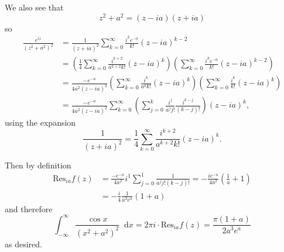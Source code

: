 \documentclass{article}
\newcommand\Res{\mathrm{Res}}
\newcommand\dif{\mathop{}\!\mathrm{d}}
\begin{document}
We also see that
$$
   z^2 + a^2
 = (z - ia)(z + ia)
$$
so
\begin{align*}
   \frac{e^{iz}}{(z^2 + a^2)^2}
&= \frac{1}{(z + ia)^2}
   \sum_{k=0}^\infty
     \frac{i^k e^{-a}}{k!}
     (z - ia)^{k-2} \\
&= \left(
     \frac{1}{4}
     \sum_{k=0}^\infty
       \frac{i^{k+2}}{a^{k+2} k!}
       (z - ia)^k
   \right)
   \left(
     \sum_{k=0}^\infty
       \frac{i^k e^{-a}}{k!}
       (z - ia)^{k-2}
   \right) \\
&= \frac{-e^{-a}}{4a^2 (z - ia)^2}
   \left(
     \sum_{k=0}^\infty
       \frac{i^k}{a^k k!}
       (z - ia)^k
   \right)
   \left(
     \sum_{k=0}^\infty
       \frac{i^k}{k!}
       (z - ia)^{k}
   \right) \\
&= \frac{-e^{-a}}{4a^2 (z - ia)^2}
   \sum_{k=0}^\infty
     \left(
       \sum_{j=0}^k
         \frac{i^j}
              {a^j j!}
         \frac{i^{k-j}}
              {(k - j)!}
     \right)
     (z - ia)^k,
\end{align*}
using the expansion
$$
  \frac{1}{(z + ia)^2}
= \frac{1}{4}
     \sum_{k=0}^\infty
       \frac{i^{k+2}}{a^{k+2} k!}
       (z - ia)^k.
$$

Then by definition
\begin{align*}
   \Res_{ia} f(z)
&= \frac{-e^{-a}}{4a^2}
   i^1
   \sum_{j=0}^1
     \frac{1}
          {a^j j! (k - j)!}
 = -\frac{i e^{-a}}{4a^2}
   \left(
     \frac{1}{a} + 1
   \right) \\
&= -\frac{i}{4}
   \frac{1}{a^3 e^a}
    (1 + a)
\end{align*}
and therefore
$$
  \int_{-\infty}^\infty
    \frac{\cos x}
         {(x^2 + a^2)^2}
    \dif x
= 2 \pi i \cdot \Res_{ia} f(z)
= \frac{\pi (1 + a)}
       {2 a^3 e^a}
$$
as desired.
\end{document}
